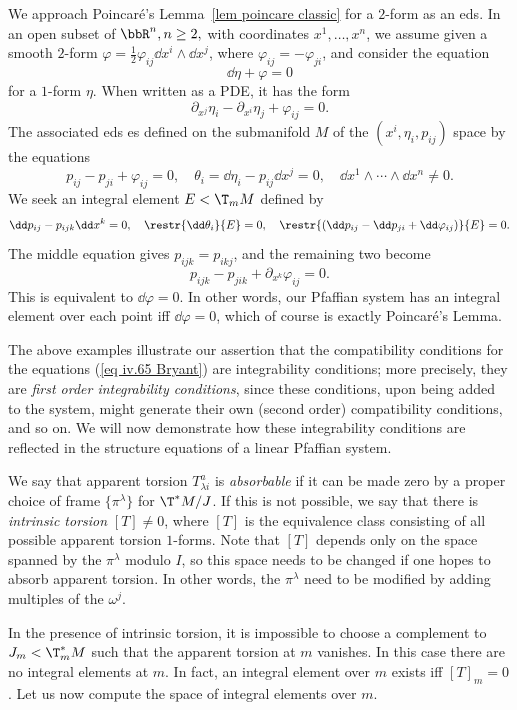 \begin{example}
    We approach Poincar\'e's Lemma~\ref{lem poincare classic} for a $2$-form as an \gls{eds}. In an open subset of $\bbR^n,n\geq 2,$ with coordinates $x^1,\ldots,x^n$, we assume given a smooth $2$-form $\varphi=\frac12\varphi_{ij}\dd x^i\wedge\dd x^j$, where $\varphi_{ij}=-\varphi_{ji}$, and consider the equation 
    \[\dd\eta+\varphi=0\]
    for a $1$-form $\eta$. When written as a PDE, it has the form 
    \[\partial_{x^j}\eta_i-\partial_{x^i}\eta_j+\varphi_{ij}=0.\]
    The associated \gls{eds} es defined on the submanifold $M$ of the $(x^i,\eta_i,p_{ij})$ space by the equations 
    \[p_{ij}-p_{ji}+\varphi_{ij}=0,\quad \theta_i=\dd \eta_i-p_{ij}\dd x^j=0,\quad \dd x ^1\wedge\cdots\wedge\dd x^n\neq 0.\]
    We seek an integral element $E<\T_m M$ defined by 
    \[\dd p_{ij}-p_{ijk}\dd x^k=0,\quad \restr{\dd \theta_i}{E}=0,\quad \restr{(\dd p_{ij}-\dd p_{ji}+\dd\varphi_{ij})}{E}=0.\]
    The middle equation gives $p_{ijk}=p_{ikj}$, and the remaining two become 
    \[p_{ijk}-p_{jik}+\partial_{x^k}\varphi_{ij}=0.\]
    This is equivalent to $\dd\varphi=0$. In other words, our Pfaffian system has an integral element over each point iff $\dd\varphi=0$, which of course is exactly Poincar\'e's Lemma.
\end{example}

The above examples illustrate our assertion that the compatibility conditions for the equations (\ref{eq iv.65 Bryant}) are integrability conditions; more precisely, they are \emph{first order integrability conditions}, since these conditions, upon being added to the system, might generate their own (second order) compatibility conditions, and so on. We will now demonstrate how these integrability conditions are reflected in the structure equations of a linear Pfaffian system.

We say that apparent torsion $T^a_{\lambda i}$ is \emph{absorbable} if it can be made zero by a proper choice of frame $\{\pi^\lambda\}$ for $\T^\ast M\slash J$. If this is not possible, we say that there is \emph{intrinsic torsion} $[T]\neq 0$, where $[T]$ is the equivalence class consisting of all possible apparent torsion $1$-forms. Note that $[T]$ depends only on the space spanned by the $\pi^\lambda$ modulo $I$, so this space needs to be changed if one hopes to absorb apparent torsion. In other words, the $\pi^\lambda$ need to be modified by adding multiples of the $\omega^j$.

In the presence of intrinsic torsion, it is impossible to choose a complement to $J_m<\T^\ast_mM$ such that the apparent torsion at $m$ vanishes. In this case there are no integral elements at $m$. In fact, an integral element over $m$ exists iff $[T]_m=0$. Let us now compute the space of integral elements over $m$.

